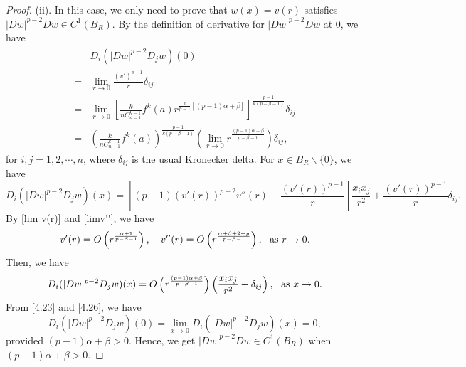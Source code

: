\documentclass[a4paper,11pt]{amsart}
\theoremstyle{plain}
\theoremstyle{remark}
\numberwithin{equation}{section}
\numberwithin{figure}{section}
\numberwithin{remark}{section}
\begin{document}
\begin{sloppypar}
\begin{proof}
\vspace{2mm}

(ii). In this case, we only need to prove that $w(x)=v(r)$ satisfies $|Dw|^{p-2}Dw \in C^1(B_R)$.
By the definition of derivative for $|Dw|^{p-2}Dw$ at $0$, we have
\begin{equation}\label{4.23}
\begin{aligned}
   & D_i(|Dw|^{p-2}D_jw)(0) \\
= & \lim_{r\to 0} \frac{(v')^{p-1}}{r} \delta_{ij} \\
= & \lim_{r\to 0} \left[ \frac{k}{n C_{n-1}^{k-1}} f^k(a) r^{\frac{k}{p-1}[(p-1)\alpha +\beta]} \right]^{\frac{p-1}{k(p-\beta-1)}} \delta_{ij} \\
= & \left( \frac{k}{n C_{n-1}^{k-1}} f^k(a) \right)^{\frac{p-1}{k(p-\beta-1)}} \left(\lim_{r\to 0} r^{\frac{(p-1)\alpha+\beta}{p-\beta -1}} \right) \delta_{ij},
\end{aligned}
\end{equation}
for $i, j=1, 2, \cdots, n$, where $\delta_{ij}$ is the usual Kronecker delta. For $x\in B_R\backslash \{0\}$, we have
\begin{equation}\label{4.24}
D_i(|Dw|^{p-2}D_jw)(x) = \left [ (p-1)(v'(r))^{p-2}v''(r) - \frac{(v'(r))^{p-1}}{r} \right ]\frac{x_ix_j}{r^2} +  \frac{(v'(r))^{p-1}}{r}\delta_{ij}.
\end{equation}
By \eqref{lim v(r)} and \eqref{limv''}, we have
\begin{equation}\label{4.25}
v'(r) = O\left ( r^{\frac{\alpha+1}{p-\beta-1}} \right), \quad v''(r) = O \left( r^{\frac{\alpha +\beta +2 -p}{p-\beta-1}} \right), \ \ {\rm as} \ r\to 0. 
\end{equation}
Then, we have
\begin{equation}\label{4.26}
D_i(|Dw|^{p-2}D_jw)(x) = O \left( r^{\frac{(p-1)\alpha +\beta}{p-\beta-1}} \right) \left( \frac{x_ix_j}{r^2} +  \delta_{ij}\right),\ \ {\rm as} \ x\to 0. 
\end{equation}
From \eqref{4.23} and \eqref{4.26}, we have
\begin{equation}\label{4.27}
D_i(|Dw|^{p-2}D_jw)(0) = \lim_{x\to 0}D_i(|Dw|^{p-2}D_jw)(x) =0,
\end{equation}
provided $(p-1)\alpha +\beta>0$. Hence, we get $|Dw|^{p-2}Dw \in C^1(B_R)$ when $(p-1)\alpha +\beta>0$.


\end{proof}
\end{sloppypar}
\end{document}
